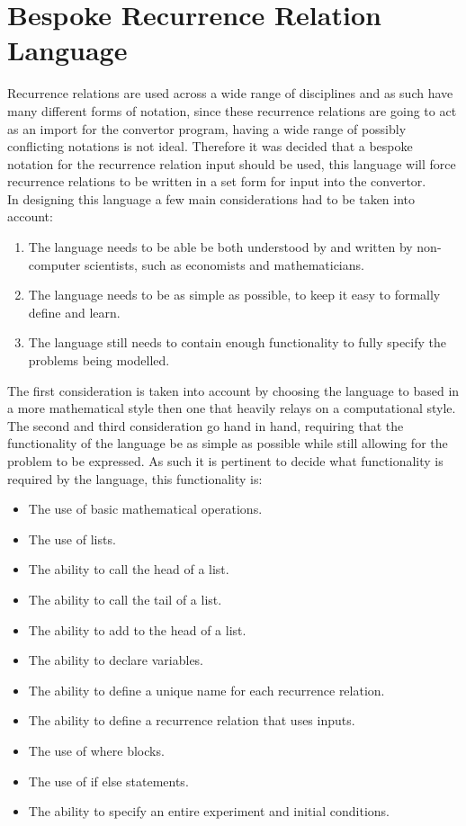 \documentclass{article}
\begin{document}
\section{Bespoke Recurrence Relation Language}
Recurrence relations are used across a wide range of disciplines and as such have many different forms of notation, since these recurrence relations are going to act as an import for the convertor program, having a wide range of possibly conflicting notations is not ideal. Therefore it was decided that a bespoke notation for the recurrence relation input should be used, this language will force recurrence relations to be written in a set form for input into the convertor.\\
In designing this language a few main considerations had to be taken into account:    
\begin{enumerate}
  \item The language needs to be able be both understood by and written by non-computer scientists, such as economists and mathematicians. 
  \item The language needs to be as simple as possible, to keep it easy to formally define and learn.
  \item The language still needs to contain enough functionality to fully specify the problems being modelled.
\end{enumerate}
The first consideration is taken into account by choosing the language to based in a more mathematical style then one that heavily relays on a computational style.%
The second and third consideration go hand in hand, requiring that the functionality of the language be as simple as possible while still allowing for the problem to be expressed. As such it is pertinent to decide what functionality is required by the language, this functionality is:      
\begin{itemize}
  \item The use of basic mathematical operations.
  \item The use of lists.
  \item The ability to call the head of a list. %
  \item The ability to call the tail of a list. %
  \item The ability to add to the head of a list. %
  \item The ability to declare variables.  
  \item The ability to define a unique name for each recurrence relation.
  \item The ability to define a recurrence relation that uses inputs.
  \item The use of where blocks.
  \item The use of if else statements. 
  \item The ability to specify an entire experiment and initial conditions.  
\end{itemize}
\end{document}
